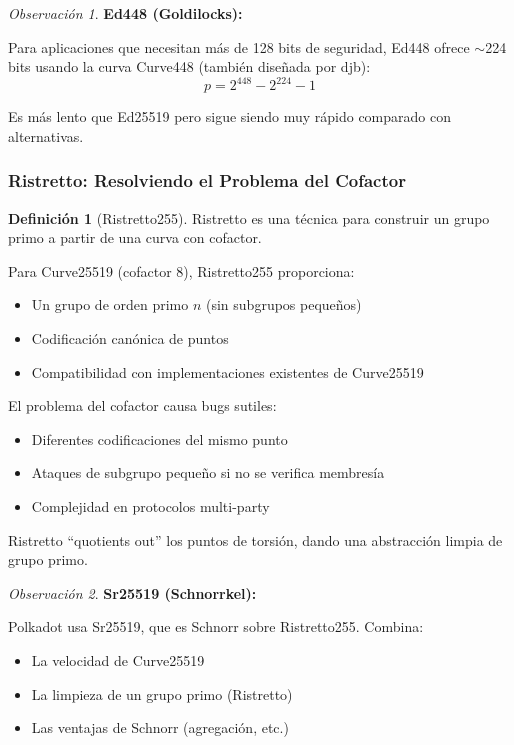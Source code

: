\documentclass[11pt,a4paper,twoside,openright]{book}
\theoremstyle{definition}
\newtheorem{definition}{Definición}[chapter]
\theoremstyle{plain}
\theoremstyle{remark}
\newtheorem{remark}{Observación}[chapter]
\begin{document}
\begin{remark}
\textbf{Ed448 (Goldilocks):}

Para aplicaciones que necesitan más de 128 bits de seguridad, Ed448 ofrece $\sim$224 bits usando la curva Curve448 (también diseñada por djb):
\[ p = 2^{448} - 2^{224} - 1 \]

Es más lento que Ed25519 pero sigue siendo muy rápido comparado con alternativas.
\end{remark}

\subsubsection{Ristretto: Resolviendo el Problema del Cofactor}

\begin{definition}[Ristretto255]
Ristretto es una técnica para construir un grupo primo a partir de una curva con cofactor.

Para Curve25519 (cofactor 8), Ristretto255 proporciona:
\begin{itemize}
    \item Un grupo de orden primo $n$ (sin subgrupos pequeños)
    \item Codificación canónica de puntos
    \item Compatibilidad con implementaciones existentes de Curve25519
\end{itemize}
\end{definition}

\begin{intuicion}
El problema del cofactor causa bugs sutiles:
\begin{itemize}
    \item Diferentes codificaciones del mismo punto
    \item Ataques de subgrupo pequeño si no se verifica membresía
    \item Complejidad en protocolos multi-party
\end{itemize}

Ristretto ``quotients out'' los puntos de torsión, dando una abstracción limpia de grupo primo.
\end{intuicion}

\begin{remark}
\textbf{Sr25519 (Schnorrkel):}

Polkadot usa Sr25519, que es Schnorr sobre Ristretto255. Combina:
\begin{itemize}
    \item La velocidad de Curve25519
    \item La limpieza de un grupo primo (Ristretto)
    \item Las ventajas de Schnorr (agregación, etc.)
\end{itemize}
\end{remark}
\end{document}
